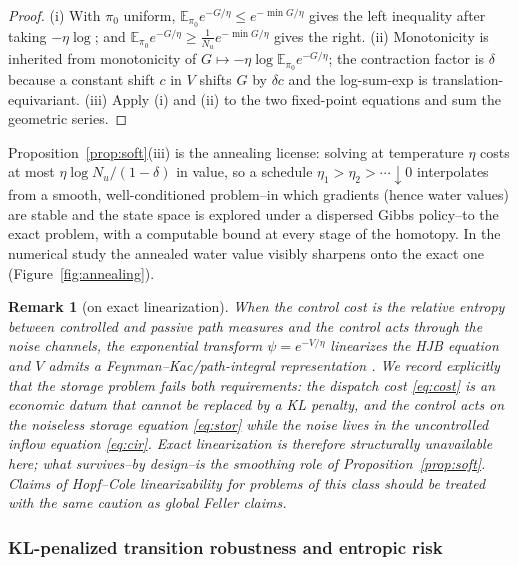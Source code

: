 \documentclass[pdflatex,sn-mathphys-num]{sn-jnl}
\theoremstyle{thmstyleone}
\theoremstyle{thmstyletwo}
\newtheorem{remark}[theorem]{Remark}
\theoremstyle{thmstylethree}
\newcommand{\E}{\mathbb{E}}
\begin{document}
\begin{proof}
(i) With $\pi_0$ uniform,
$\E_{\pi_0} e^{-G/\eta} \le e^{-\min G/\eta}$ gives the left inequality
after taking $-\eta\log$; and
$\E_{\pi_0} e^{-G/\eta} \ge \tfrac1{N_u} e^{-\min G/\eta}$ gives the
right. (ii) Monotonicity is inherited from monotonicity of
$G \mapsto -\eta\log\E_{\pi_0}e^{-G/\eta}$; the contraction factor is
$\delta$ because a constant shift $c$ in $V$ shifts $G$ by $\delta c$ and
the log-sum-exp is translation-equivariant. (iii) Apply (i) and (ii) to
the two fixed-point equations and sum the geometric series.
\end{proof}

Proposition~\ref{prop:soft}(iii) is the annealing license: solving at
temperature $\eta$ costs at most $\eta\log N_u/(1-\delta)$ in value, so a
schedule $\eta_1 > \eta_2 > \cdots \downarrow 0$ interpolates from a
smooth, well-conditioned problem--in which gradients (hence water
values) are stable and the state space is explored under a dispersed
Gibbs policy--to the exact problem, with a computable bound at every
stage of the homotopy. In the numerical study the annealed water value
visibly sharpens onto the exact one (Figure~\ref{fig:annealing}).

\begin{remark}[on exact linearization]\label{rem:hopfcole}
When the control cost \emph{is} the relative entropy between controlled
and passive path measures and the control acts through the noise
channels, the exponential transform $\psi = e^{-V/\eta}$ linearizes the
HJB equation and $V$ admits a Feynman--Kac/path-integral representation
\citep{todorov2009,kappen2005}. We record explicitly that the storage
problem \emph{fails both requirements}: the dispatch cost
\eqref{eq:cost} is an economic datum that cannot be replaced by a KL
penalty, and the control acts on the noiseless storage equation
\eqref{eq:stor} while the noise lives in the uncontrolled inflow equation
\eqref{eq:cir}. Exact linearization is therefore structurally unavailable
here; what survives--by design--is the smoothing role of
Proposition~\ref{prop:soft}. Claims of Hopf--Cole linearizability for
problems of this class should be treated with the same caution as global
Feller claims.
\end{remark}

\subsubsection{KL-penalized transition robustness and entropic risk}
\label{sec:robust}
\end{document}
